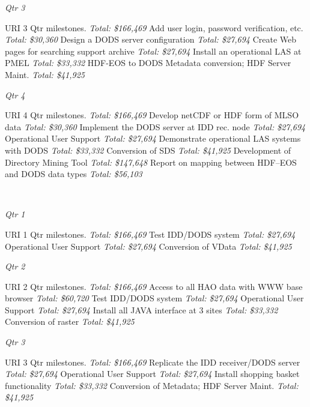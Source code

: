 \documentclass[12pt]{article}
\begin{document}
  \centerline{\it Qtr 3 }

 URI 3 Qtr milestones.  {\it Total: \$166,469}
 Add user login, password verification, etc. {\it
  Total: \$30,360}
 Design a DODS server configuration {\it Total: \$27,694}
 Create Web pages for searching support archive {\it
  Total: \$27,694}
 Install an operational LAS at PMEL {\it Total: \$33,332}
 HDF-EOS to DODS Metadata conversion; HDF Server
  Maint. {\it Total: \$41,925}

  \centerline{\it Qtr 4}

 URI 4 Qtr milestones.  {\it Total: \$166,469}
 Develop netCDF or HDF form of MLSO data {\it Total: \$30,360}
 Implement the DODS server at IDD rec. node {\it
  Total: \$27,694}
 Operational User Support {\it Total: \$27,694}
 Demonstrate operational LAS systems with DODS {\it
  Total: \$33,332}
 Conversion of SDS {\it Total: \$41,925}
 Development of Directory Mining Tool {\it Total: \$147,648}
 Report on mapping between HDF--EOS and DODS data
types {\it Total: \$56,103}

\vspace{.2in}
\\
  \centerline{\it Qtr 1}

 URI 1 Qtr milestones.  {\it Total: \$166,469}
 Test IDD/DODS system {\it Total: \$27,694}
 Operational User Support {\it Total: \$27,694}
 Conversion of VData {\it Total: \$41,925}

  \centerline{\it Qtr 2}

 URI 2 Qtr milestones.  {\it Total: \$166,469}
 Access to all HAO data with WWW base browser {\it
  Total: \$60,720}
 Test IDD/DODS system {\it Total: \$27,694}
 Operational User Support {\it Total: \$27,694}
 Install all JAVA interface at 3 sites {\it Total: \$33,332}
 Conversion of raster {\it Total: \$41,925}

  \centerline{\it Qtr 3 }

 URI 3 Qtr milestones.  {\it Total: \$166,469}
  Replicate the IDD receiver/DODS server {\it
  Total: \$27,694}
 Operational User Support {\it Total: \$27,694}
 Install shopping basket functionality {\it Total: \$33,332}
 Conversion of Metadata; HDF Server Maint. {\it Total: \$41,925}
\end{document}

